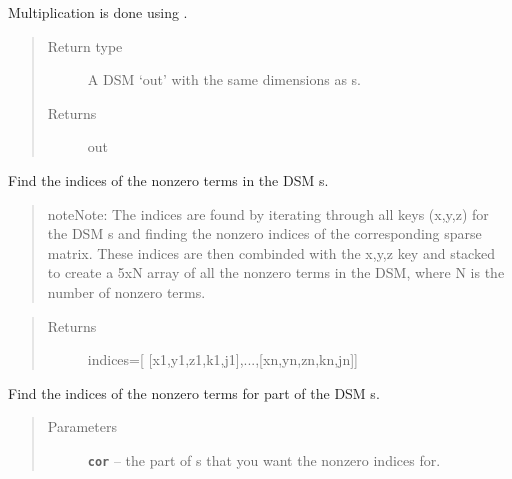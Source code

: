\documentclass[letterpaper,10pt,english]{sphinxmanual}
\begin{document}
\begin{fulllineitems}
\begin{fulllineitems}
Multiplication is done using     {\hyperref[index:DictionarySparseMatrix.DS]{}}. 
\begin{quote}\begin{description}
\item[{Return type}] \leavevmode
A DSM `out' with the same dimensions as s.

\item[{Returns}] \leavevmode
out

\end{description}\end{quote}

\end{fulllineitems}


\begin{fulllineitems}
\label{index:DictionarySparseMatrix.DS.nonzero}
Find the indices of the nonzero terms in the DSM s.
\begin{quote}

\begin{notice}{note}{Note:}
The indices are found by iterating through all           keys (x,y,z) for the DSM s and finding the nonzero           indices of the corresponding sparse matrix.           These indices are then combinded           with the x,y,z key and stacked to create a 5xN           array of all the nonzero terms in the DSM,           where N is the number of nonzero           terms.
\end{notice}
\end{quote}
\begin{quote}\begin{description}
\item[{Returns}] \leavevmode
indices={[} {[}x1,y1,z1,k1,j1{]},...,{[}xn,yn,zn,kn,jn{]}{]}

\end{description}\end{quote}

\end{fulllineitems}


\begin{fulllineitems}
\label{index:DictionarySparseMatrix.DS.nonzeroMat}
Find the indices of the nonzero terms for part of the DSM s.
\begin{quote}\begin{description}
\item[{Parameters}] \leavevmode
\textbf{\texttt{cor}} -- the part of s that you want the nonzero indices for.


\end{description}
\end{quote}
\end{fulllineitems}
\end{fulllineitems}
\end{document}
